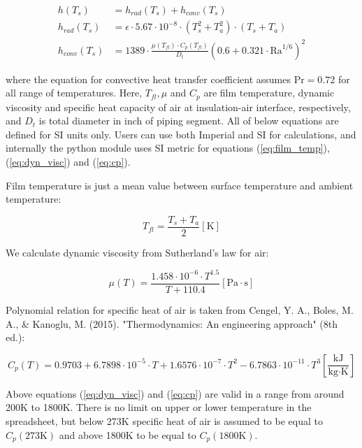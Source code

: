 \documentclass[10pt, letterpaper]{article}
\begin{document}
    \begin{equation}
    \begin{aligned}
		h(T_{s}) &= h_{rad}(T_{s}) + h_{conv}(T_{s}) \\
		h_{rad}(T_{s}) &= \epsilon \cdot 5.67 \cdot 10^{-8} \cdot
		(T_{s}^{2} + T_{a}^{2}) \cdot
		(T_{s} + T_{a}) \\
		h_{conv}(T_{s}) &= 1389 \cdot \frac{\mu(T_{fl}) \cdot C_{p}(T_{fl})}{D_{t}} \left ( 0.6 + 0.321 \cdot \text{Ra}^{1/6} \right )^{2}
		\label{eq:h_def}
    \end{aligned}
    \end{equation}

    where the equation for convective heat transfer coefficient assumes $\text{Pr} = 0.72$ for all range of temperatures.
    Here, $T_{fl}, \mu$ and $C_{p}$ are film temperature, dynamic viscosity and specific heat capacity of air at insulation-air interface, respectively, and $D_{t}$ is total diameter in inch of piping segment. All of below equations are defined for SI units only. Users can use both Imperial and SI for calculations, and internally the python module uses SI metric for equations (\ref{eq:film_temp}), (\ref{eq:dyn_visc}) and (\ref{eq:cp}).

	Film temperature is just a mean value between surface temperature and ambient temperature:

	\begin{equation}
		T_{fl} = \frac{T_{s} + T_{a}}{2}
		\left[ \text{K} \right]
		\label{eq:film_temp}
	\end{equation}

	We calculate dynamic viscosity from Sutherland's law for air:

	\begin{equation}
	    \mu(T) = \frac{1.458 \cdot 10^{-6} \cdot T^{1.5}}{T + 110.4}
		[\text{Pa} \cdot \text{s}]
		\label{eq:dyn_visc}
	\end{equation}

	Polynomial relation for specific heat of air is taken from Cengel, Y. A., Boles, M. A., \& Kanoglu, M. (2015). "Thermodynamics: An engineering approach" (8th ed.):

	\begin{equation}
		C_{p}(T) = 0.9703 + 6.7898 \cdot 10^{-5} \cdot T + 1.6576 \cdot 10^{-7} \cdot T^{2} - 6.7863 \cdot 10^{-11} \cdot T^{3}
		\left[\frac{\text{kJ}}{\text{kg} \cdot \text{K}} \right]
		\label{eq:cp}
	\end{equation}

	Above equations (\ref{eq:dyn_visc}) and (\ref{eq:cp}) are valid in a range from around 200K to 1800K. There is no limit on upper or lower temperature in the spreadsheet, but below 273K specific heat of air is assumed to be equal to $C_{p}(273 \text{K})$ and above 1800K to be equal to $C_{p}(1800 \text{K})$.
\end{document}
